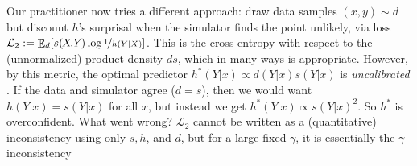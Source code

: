 \documentclass[twoside]{article}
\makeatletter
\theoremstyle{plain}
\theoremstyle{definition}
\DeclareMathOperator*{\Ex}{\mathbb{E}} %
\newcommand{\balpha}{\boldsymbol\alpha}
\newcommand{\dg}[1]{\mathbdcal{#1}}
\newcommand\aar{\@ifstar\aar@one@star\aar@plain}
\newcommand\aar@one@star{\@ifstar\aar@resize{\aar@plain*}}
\newcommand\aar@resize[1]{\sbox{\aar@content}{#1}\scaleleftright[3.8ex]
			{\Biggl\langle\!\!\!\!\Biggl\langle}{\usebox{\aar@content}}
			{\Biggr\rangle\!\!\!\!\Biggr\rangle}}
\makeatother
\begin{document}
Our practitioner now tries a different approach: draw data samples $(x,y) \sim d$ but discount $h$'s surprisal when the simulator finds the point unlikely, via loss $\mathcal L_2 := \Ex_{d} [s(\mkern-2muX\!,\!Y\mkern-2mu) \log \nf1{h(Y|X)}]$.
This is the cross entropy with respect to the (unnormalized) product density $ds$, which in many ways is appropriate.
However, by this metric, the optimal predictor $h^*(Y|x) \propto d(Y|x) s(Y|x)$ is
\emph{uncalibrated} \parencite{dawid1982well}.
If the data and simulator agree ($d \!=\! s$), then we would want $h(Y|x) \!=\! s(Y|x)$ for all $x$, but instead we get $h^*(Y|x) \propto s(Y|x)^2$.
So $h^*$ is overconfident.
What went wrong?
$\mathcal L_2$ cannot be written as a (quantitative) inconsistency
using only $s,h$, and $d$, 
but for a large fixed $\gamma$, it is essentially the $\gamma$-inconsistency
\end{document}
